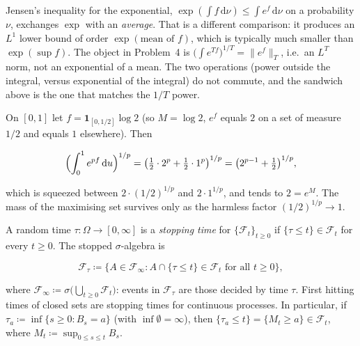 \documentclass[11pt,a4paper]{article}
\begin{document}
\begin{remark}
\label{rem:not-jensen}
Jensen's inequality for the exponential, \(\exp(\int f\,\mathrm{d}\nu)\le\int e^{f}\,\mathrm{d}\nu\) on a probability \(\nu\), exchanges \(\exp\) with an \emph{average}. That is a different comparison: it produces an \(L^{1}\) lower bound of order \(\exp(\text{mean of }f)\), which is typically much smaller than \(\exp(\sup f)\). The object in Problem~4 is \(\bigl(\int e^{Tf}\bigr)^{1/T}=\|e^{f}\|_{T}\), i.e.\ an \(L^{T}\) norm, not an exponential of a mean. The two operations (power outside the integral, versus exponential of the integral) do not commute, and the sandwich above is the one that matches the \(1/T\) power.
\end{remark}

\begin{example}
\label{ex:laplace-two-values}
On \([0,1]\) let \(f=\mathbf{1}_{[0,1/2]}\log 2\) (so \(M=\log 2\), \(e^{f}\) equals \(2\) on a set of measure \(1/2\) and equals \(1\) elsewhere). Then

\[
\Bigl(\int_{0}^{1} e^{p f}\,\mathrm{d}u\Bigr)^{1/p}
=
\bigl(\tfrac12\cdot 2^{p}+\tfrac12\cdot 1^{p}\bigr)^{1/p}
=
\bigl(2^{p-1}+\tfrac12\bigr)^{1/p},
\]

which is squeezed between \(2\cdot(1/2)^{1/p}\) and \(2\cdot 1^{1/p}\), and tends to \(2=e^{M}\). The mass of the maximising set survives only as the harmless factor \((1/2)^{1/p}\to 1\).
\end{example}

\begin{definition}
\label{def:stopping-time}
A random time \(\tau:\Omega\to[0,\infty]\) is a \emph{stopping time} for \(\{\mathcal{F}_t\}_{t\ge 0}\) if \(\{\tau\le t\}\in\mathcal{F}_t\) for every \(t\ge 0\). The stopped \(\sigma\)-algebra is

\[
\mathcal{F}_{\tau}
\coloneqq
\bigl\{A\in\mathcal{F}_{\infty}: A\cap\{\tau\le t\}\in\mathcal{F}_{t}\text{ for all }t\ge 0\bigr\},
\]

where \(\mathcal{F}_{\infty}\coloneqq\sigma\bigl(\bigcup_{t\ge 0}\mathcal{F}_{t}\bigr)\): events in \(\mathcal{F}_{\tau}\) are those decided by time \(\tau\). First hitting times of closed sets are stopping times for continuous processes. In particular, if \(\tau_{a}\coloneqq\inf\{s\ge 0:B_{s}=a\}\) (with \(\inf\emptyset=\infty\)), then \(\{\tau_{a}\le t\}=\{M_{t}\ge a\}\in\mathcal{F}_{t}\), where \(M_{t}\coloneqq\sup_{0\le s\le t}B_{s}\).
\end{definition}
\end{document}
